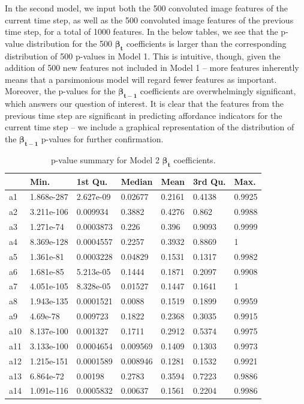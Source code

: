 \documentclass[11pt]{article}
\begin{document}
In the second model, we input both the 500 convoluted image features of the current time step, as well as the 500 convoluted image features of the previous time step, for a total of 1000 features.  In the below tables, we see that the p-value distribution for the 500 $\bm{\beta_t}$ coefficients is larger than the corresponding distribution of 500 p-values in Model 1.  This is intuitive, though, given the addition of 500 new features not included in Model 1 -- more features inherently means that a parsimonious model will regard fewer features as important.  Moreover, the p-values for the $\bm{\beta_{t-1}}$ coefficients are overwhelmingly significant, which answers our question of interest.  It is clear that the features from the previous time step are significant in predicting affordance indicators for the current time step -- we include a graphical representation of the distribution of the $\bm{\beta_{t-1}}$ p-values for further confirmation. 
\begin{table}[H]
\centering
\caption{p-value summary for Model 2 $\bm{\beta_t}$ coefficients.}
\begin{tabular}{@{}lllllll@{}}
\toprule
    & Min.       & 1st Qu.   & Median   & Mean   & 3rd Qu. & Max.   \\ \midrule
a1  & 1.868e-287 & 2.627e-09 & 0.02677  & 0.2161 & 0.4138  & 0.9925 \\
a2  & 3.211e-106 & 0.009934  & 0.3882   & 0.4276 & 0.862   & 0.9988 \\
a3  & 1.271e-74  & 0.0003873 & 0.226    & 0.396  & 0.9093  & 0.9999 \\
a4  & 8.369e-128 & 0.0004557 & 0.2257   & 0.3932 & 0.8869  & 1      \\
a5  & 1.361e-81  & 0.0003228 & 0.04829  & 0.1531 & 0.1317  & 0.9982 \\
a6  & 1.681e-85  & 5.213e-05 & 0.1444   & 0.1871 & 0.2097  & 0.9908 \\
a7  & 4.051e-105 & 8.328e-05 & 0.01527  & 0.1447 & 0.1641  & 1      \\
a8  & 1.943e-135 & 0.0001521 & 0.0088   & 0.1519 & 0.1899  & 0.9959 \\
a9  & 4.69e-78   & 0.009723  & 0.1822   & 0.2368 & 0.3035  & 0.9915 \\
a10 & 8.137e-100 & 0.001327  & 0.1711   & 0.2912 & 0.5374  & 0.9975 \\
a11 & 3.133e-100 & 0.0004654 & 0.009569 & 0.1409 & 0.1303  & 0.9973 \\
a12 & 1.215e-151 & 0.0001589 & 0.008946 & 0.1281 & 0.1532  & 0.9921 \\
a13 & 6.864e-72  & 0.00198   & 0.2783   & 0.3594 & 0.7223  & 0.9886 \\
a14 & 1.091e-116 & 0.0005832 & 0.00637  & 0.1561 & 0.2204  & 0.9986 \\ \bottomrule
\end{tabular}
\end{table}
\end{document}

